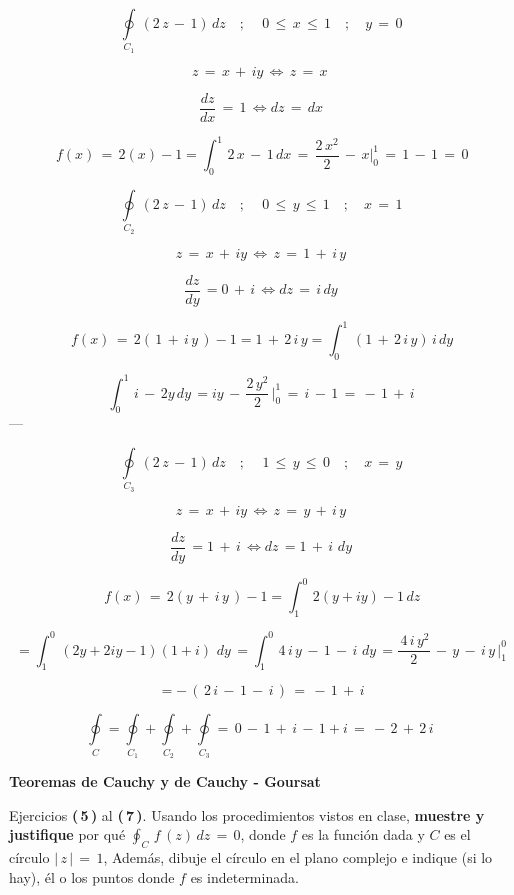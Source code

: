 \documentclass[a4paper,11pt,openany]{book}
\begin{document}
$$\displaystyle\oint\limits_{C_{1}}\,(2\,z\,-\,1)\,dz \quad;\quad \,0\,\leq\,x\,\leq\,1 \quad;\quad y\,=\,0 $$

$$ z\,=\,x\,+\,iy\,\iff \,z\,=\,x\, $$

$$ \dfrac{dz}{dx}\,=\,1\, \iff dz\,=\,dx $$

$$ \,f(x)\,=\,2(x)-1 = \displaystyle\int_{0}^{1}\,2\,x\,-\,1\,dx\,=\,\dfrac{2\,x^{2}}{2}\,-\,x \bigg|_{0}^{1}\,=\,1\,-\,1\,=\,0$$

$$\displaystyle\oint\limits_{C_{2}}\,(2\,z\,-\,1)\,dz \quad;\quad \,0\,\leq\,y\,\leq\,1 \quad;\quad x\,=\,1$$

$$ z\,=\,x\,+\,iy\,\iff \,z\,=\,1\,+\,i\,y$$

$$ \dfrac{dz}{dy}\,=0\,+\,i\, \iff dz\,=\,i\,dy$$

$$ \,f(x)\,=\,2(\,1\,+\,i\,y\,)-1 = 1\,+\,2\,i\,y = \displaystyle\int_{0}^{1}\,(1\,+\,2\,i\,y)\,i\,dy$$

$$ \displaystyle\int_{0}^{1}\,i\,-\,2y\,dy\,=iy\,-\,\dfrac{2\,y^{2}}{2}\, \bigg|_{0}^{1}\,=\,i\,-\,1\,=\,-\,1\,+\,i$$
---

$$\displaystyle\oint\limits_{C_{3}}\,(2\,z\,-\,1)\,dz \quad;\quad \,1\,\leq\,y\,\leq\,0 \quad;\quad x\,=\,y $$

$$ z\,=\,x\,+\,iy\,\iff \,z\,=\,y\,+\,i\,y $$

$$ \dfrac{dz}{dy}\,= 1\,+\,i\, \iff dz\,=1\,+\,i\,\,dy $$

$$ \,f(x)\,=\,2(y\,+\,i\,y\,)-1 = \displaystyle\int_{1}^{0}\,2(y+iy)-1\,dz$$

$$ =\displaystyle\int_{1}^{0}\,(2y+2iy-1)(1+i)\,\,dy\,= \displaystyle\int_{1}^{0}\,4\,i\,y\,-\,1\,-\,i\,\,dy\,= \dfrac{\,4\,i\,y^{2}}{2}\,-\,y\,-\,i\,y\, \bigg|_{1}^{0}$$

$$ = -\,(\,2\,i\,-\,1\,-\,i\,)\,=\,-\,1\,+\,i $$

$$\displaystyle\oint\limits_{C} = \displaystyle\oint\limits_{C_{1}} + \displaystyle\oint\limits_{C_{2}} +\displaystyle\oint\limits_{C_{3}} = \,0\,-\,1\,+\,i\,-\,1+i\, = \boxed{\,-\,2\,+\,2\,i\,} $$


\begin{center}
\textbf{Teoremas de Cauchy y de Cauchy - Goursat}
\end{center}

Ejercicios \textbf{(\,5\,)} al \textbf{(\,7\,)}. Usando los procedimientos vistos en clase, \textbf{muestre y justifique} por qué $\oint_{C}\,f\,(z)\,dz\,=\,0$, donde $f$ es la función dada y $C$ es el círculo $|\,z\,|\,=\,1$, Además, dibuje el círculo en el plano complejo e indique (si lo hay), él o los puntos donde $f$ es indeterminada.\\
\end{document}

